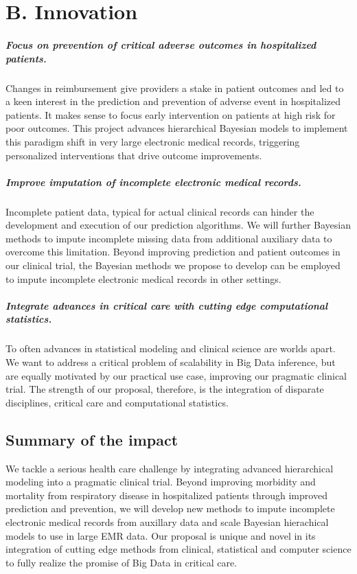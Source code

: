 \documentclass[11pt,notitlepage]{article}
\begin{document}
\section*{B. Innovation}
\subparagraph*{Focus on prevention of critical adverse outcomes in hospitalized patients.}
Changes in reimbursement give providers a stake in patient outcomes and led to a keen interest in the prediction and prevention of adverse event in hospitalized patients. It makes sense to focus early intervention on patients at high risk for poor outcomes. This project advances hierarchical Bayesian models to implement this paradigm shift in very large electronic medical records, triggering personalized interventions that drive outcome improvements.

\subparagraph*{Improve imputation of incomplete electronic medical records.}
Incomplete patient data, typical for actual clinical records can hinder the development and execution of our prediction algorithms. We will further Bayesian methods to impute incomplete missing data from additional auxiliary data to overcome this limitation. Beyond improving prediction and patient outcomes in our clinical trial, the Bayesian methods we propose to develop can be employed to impute incomplete electronic medical records in other settings.

\subparagraph*{Integrate advances in critical care with cutting edge computational statistics.}
To often advances in statistical modeling and clinical science are worlds apart. We want to address a critical problem of scalability in Big Data inference, but are equally motivated by our practical use case, improving our pragmatic clinical trial. The strength of our proposal, therefore, is the integration of disparate disciplines, critical care and computational statistics. 

\subsection*{Summary of the impact}
We tackle a serious health care challenge by integrating advanced hierarchical modeling into a pragmatic clinical trial. Beyond improving morbidity and mortality from respiratory disease in hospitalized patients through improved prediction and prevention, we will develop new methods to impute incomplete electronic medical records from auxillary data and scale Bayesian hierachical models to use in large EMR data. Our proposal is unique and novel in its integration of cutting edge methods from clinical, statistical and computer science to fully realize the promise of Big Data in critical care.
\end{document}
